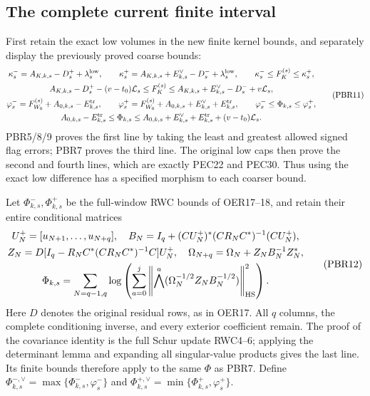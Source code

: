 \documentclass[11pt,a4paper]{article}
\begin{document}
\subsection{The complete current finite interval}

First retain the exact low volumes in the new finite kernel bounds,
and separately display the previously proved coarse bounds:
\[
\begin{gathered}
 \kappa_s^-=A_{K,k,s}-D_s^++\lambda_s^{\rm low},\qquad
 \kappa_s^+=A_{K,k,s}+E_{k,s}^{\vee}-D_s^-+\lambda_s^{\rm low},
 \qquad \kappa_s^-\le F_K^{(s)}\le\kappa_s^+,\\
 A_{K,k,s}-D_s^+-(v-t_0)\mathcal L_s\le F_K^{(s)}
 \le A_{K,k,s}+E_{k,s}^{\vee}-D_s^-+v\mathcal L_s,\\
 \varphi_s^-=F_{W_0}^{(s)}+A_{0,k,s}-E_{k,s}^{\rm tr},\qquad
 \varphi_s^+=F_{W_0}^{(s)}+A_{0,k,s}+E_{k,s}^{\vee}+E_{k,s}^{\rm tr},
 \qquad \varphi_s^-\le\Phi_{k,s}\le\varphi_s^+,\\
 A_{0,k,s}-E_{k,s}^{\rm tr}\le\Phi_{k,s}
 \le A_{0,k,s}+E_{k,s}^{\vee}+E_{k,s}^{\rm tr}
                                      +(v-t_0)\mathcal L_s.
\end{gathered}\tag{PBR11}
\]
PBR5/8/9 proves the first line by taking the least and greatest
allowed signed flag errors; PBR7 proves the third line. The
original low caps then prove the second and fourth lines, which
are exactly PEC22 and PEC30. Thus using the exact low difference
has a specified morphism to each coarser bound.

Let $\Phi^-_{k,s},\Phi^+_{k,s}$ be the full-window RWC bounds of
OER17--18, and retain their entire conditional matrices
\[
\begin{gathered}
 U_N^+=[u_{N+1},\ldots,u_{N+q}],\quad
 B_N=I_q+(CU_N^+)^*(CR_NC^*)^{-1}(CU_N^+),\\
 Z_N=D[I_q-R_NC^*(CR_NC^*)^{-1}C]U_N^+,\quad
 \Omega_{N+q}=\Omega_N+Z_NB_N^{-1}Z_N^*,\\
 \Phi_{k,s}=\sum_{N=q-1,q}
 \log\left(\sum_{a=0}^j
 \left\|\bigwedge^a(\Omega_N^{-1/2}Z_NB_N^{-1/2})\right\|_{\rm HS}^2\right).
\end{gathered}\tag{PBR12}
\]
Here $D$ denotes the original residual rows, as in OER17.
All $q$ columns, the complete conditioning inverse, and every
exterior coefficient remain. The proof of the covariance identity
is the full Schur update RWC4--6; applying the determinant lemma
and expanding all singular-value products gives the last line.
Its finite bounds therefore apply to the same $\Phi$ as PBR7.
Define
$\Phi_{k,s}^{-,\vee}=\max\{\Phi^-_{k,s},\varphi_s^-\}$ and
$\Phi_{k,s}^{+,\vee}=\min\{\Phi^+_{k,s},\varphi_s^+\}$.
\end{document}
